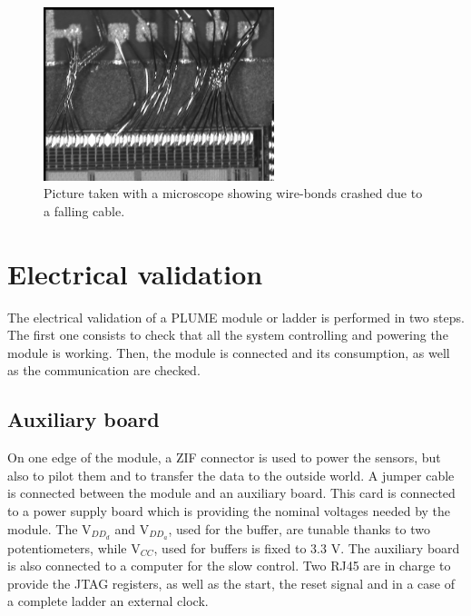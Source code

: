 
  \begin{figure}[!h]
    \centering
    \includegraphics[width=0.6\textwidth]{Pictures/labTests/crash_bonds.jpg}
    \caption{Picture taken with a microscope showing wire-bonds crashed due to a falling cable.}
    \label{fig:wireBondsCrashed}
  \end{figure}

\section{Electrical validation}

  The electrical validation of a \gls{PLUME} module or ladder is performed in two steps.
  The first one consists to check that all the system controlling and powering the module is working. 
  Then, the module is connected and its consumption, as well as the communication are checked.

  \subsection{Auxiliary board}

  On one edge of the module, a ZIF connector is used to power the sensors, but also to pilot them and to transfer the data to the outside world.
  A jumper cable is connected between the module and an auxiliary board.
  This card is connected to a power supply board which is providing the nominal voltages needed by the module.
  The $\text{V}_{DD_d}$ and $\text{V}_{DD_a}$, used for the buffer, are tunable thanks to two potentiometers, while $\text{V}_{CC}$, used for buffers is fixed to 3.3 V.
  The auxiliary board is also connected to a computer for the slow control.
  Two RJ45 are in charge to provide the JTAG registers, as well as the start, the reset signal and in a case of a complete ladder an external clock.

